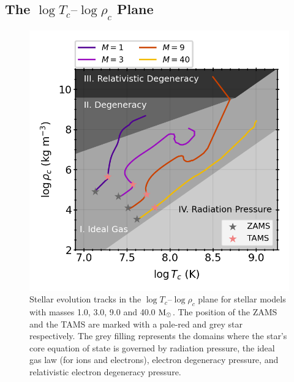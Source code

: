 \onecolumn
\twocolumn

\subsection{The $\log T_c \text{--} \log \rho_c$ Plane}


\begin{figure}[!ht]
    \centering
    \includegraphics[width=1.0\columnwidth]{../figures/t_rho_tracks.png}  %
    \caption{\small Stellar evolution tracks in the $\log T_c \text{--} \log \rho_c$ plane for stellar models with masses 1.0, 3.0, 9.0 and 40.0 ${\rm M}_\odot$. The position of the ZAMS and the TAMS are marked with a pale-red and grey star respectively. The grey filling represents the domains where the star's core equation of state is governed by radiation pressure, the ideal gas law (for ions and electrons), electron degeneracy pressure, and relativistic electron degeneracy pressure.}
    \label{fig:tc_rhoc}
\end{figure}

